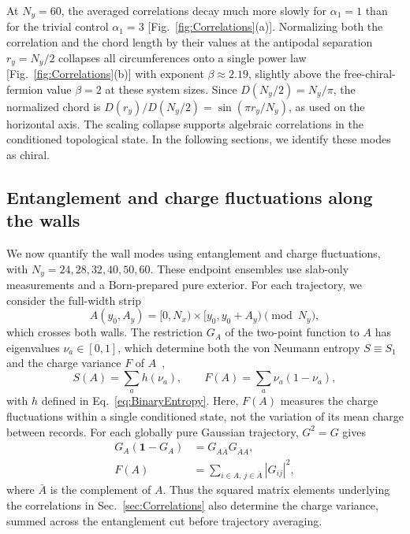 \documentclass[aps,prb,10pt,twocolumn,superscriptaddress,longbibliography,floatfix]{revtex4-2}
\newcommand{\newtext}[1]{{\color{blue}#1}}
\begin{document}
\newtext{At $N_y=60$, the averaged correlations decay much more slowly for $\alpha_1=1$ than for the trivial control $\alpha_1=3$ [Fig.~\ref{fig:Correlations}(a)].} \newtext{Normalizing both the correlation and the chord length by their values at the antipodal separation $r_y=N_y/2$ collapses all circumferences onto a single power law [Fig.~\ref{fig:Correlations}(b)] with exponent $\beta\approx2.19$, slightly above the free-chiral-fermion value $\beta=2$ at these system sizes.} \newtext{Since $D(N_y/2)=N_y/\pi$, the normalized chord is $D(r_y)/D(N_y/2)=\sin(\pi r_y/N_y)$, as used on the horizontal axis. The scaling collapse supports algebraic correlations in the conditioned topological state.} In the following sections, we identify these modes as chiral.

\subsection{Entanglement and charge fluctuations along the walls}
\label{sec:Entanglement}

{\color{blue}
We now quantify the wall modes using entanglement and charge fluctuations, with $N_y=24,28,32,40,50,60$. These endpoint ensembles use slab-only measurements and a Born-prepared pure exterior. For each trajectory, we consider the full-width strip
\begin{equation}
    A(y_0,A_y)=[0,N_x)\times[y_0,y_0+A_y)\pmod{N_y},
    \label{eq:Strip}
\end{equation}
which crosses both walls. The restriction $G_A$ of the two-point function to $A$ has eigenvalues $\nu_a\in[0,1]$, which determine both the von Neumann entropy $S\equiv S_1$ and the charge variance $F$ of $A$~\cite{KlichLevitov2009,SongFlindtRachel2011},
\begin{equation}
    S(A)=\sum_a h(\nu_a),
    \qquad
    F(A)=\sum_a\nu_a(1-\nu_a),
    \label{eq:EntropyVariance}
\end{equation}
\newtext{with $h$ defined in Eq.~\eqref{eq:BinaryEntropy}.}
Here, $F(A)$ measures the charge fluctuations within a single conditioned state, not the variation of its mean charge between records. For each globally pure Gaussian trajectory, $G^2=G$ gives
\begin{align}
 G_A(\mathbf{1}-G_A)&=G_{A\bar A}G_{\bar A A},\nonumber\\
 F(A)&=\sum_{i\in A,\,j\in\bar A}|G_{ij}|^2,
 \label{eq:VarianceCrossCut}
\end{align}
where $\bar A$ is the complement of $A$. Thus the squared matrix elements underlying the correlations in Sec.~\ref{sec:Correlations} also determine the charge variance, summed across the entanglement cut before trajectory averaging.
}
\end{document}
